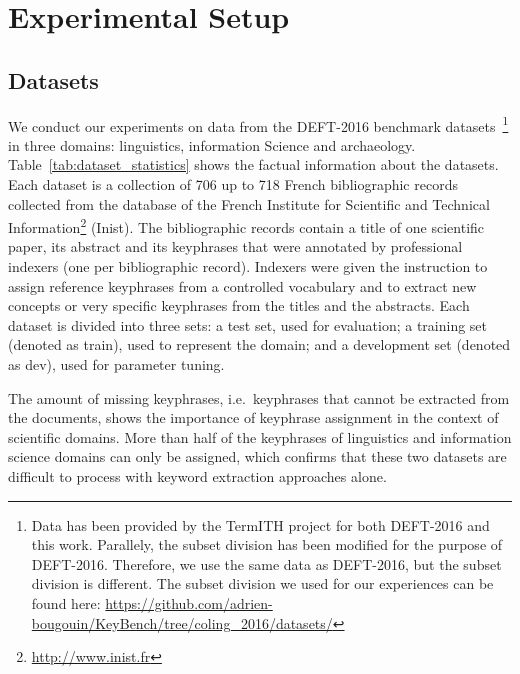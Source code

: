 \section{Experimental Setup}
\label{sec:experimental_setup}
    \subsection{Datasets}
    \label{subsec:datasets}
    
        We conduct our experiments on data from the DEFT-2016 benchmark datasets~\cite{daille-et-al:2016:DEFT}\footnote{Data has been provided by the TermITH project for both DEFT-2016 and this work. Parallely, the subset division has been modified for the purpose of DEFT-2016. Therefore, we use the same data as DEFT-2016, but the subset division is different. The subset division we used for our experiences can be found here: \url{https://github.com/adrien-bougouin/KeyBench/tree/coling_2016/datasets/}} in three domains: linguistics, information Science and archaeology.
        Table~\ref{tab:dataset_statistics} shows the factual information about the datasets.
        Each dataset is a collection of 706 up to 718 French bibliographic records collected from the database of the French Institute for Scientific and Technical Information\footnote{\url{http://www.inist.fr}} (Inist).
        The bibliographic records contain a title of one scientific paper, its abstract and its keyphrases that were annotated by professional indexers (one per bibliographic record).
        Indexers were given the instruction to assign reference keyphrases from a controlled vocabulary and to extract new concepts or very specific keyphrases from the titles and the abstracts.
        Each dataset is divided into three sets: a test set, used for evaluation; a training set (denoted as train), used to represent the domain; and a development set (denoted as dev), used for parameter tuning.
        
        

        The amount of missing keyphrases, i.e.~keyphrases that cannot be extracted from the documents, shows the importance of keyphrase assignment in the context of scientific domains.
        More than half of the keyphrases of linguistics and information science domains can only be assigned, which confirms that these two datasets are difficult to process with keyword extraction approaches alone. 

